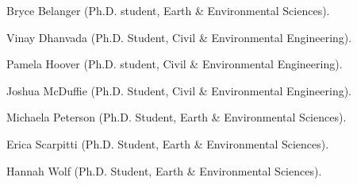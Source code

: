 \item Bryce Belanger (Ph.D. student, Earth \& Environmental Sciences).
\item Vinay Dhanvada (Ph.D. Student, Civil \& Environmental Engineering).
\item Pamela Hoover (Ph.D. student, Civil \& Environmental Engineering).
\item Joshua McDuffie (Ph.D. Student, Civil \& Environmental Engineering).
\item Michaela Peterson (Ph.D. Student, Earth \& Environmental Sciences).
\item Erica Scarpitti (Ph.D. Student, Earth \& Environmental Sciences).
\item Hannah  Wolf (Ph.D. Student, Earth \& Environmental Sciences).